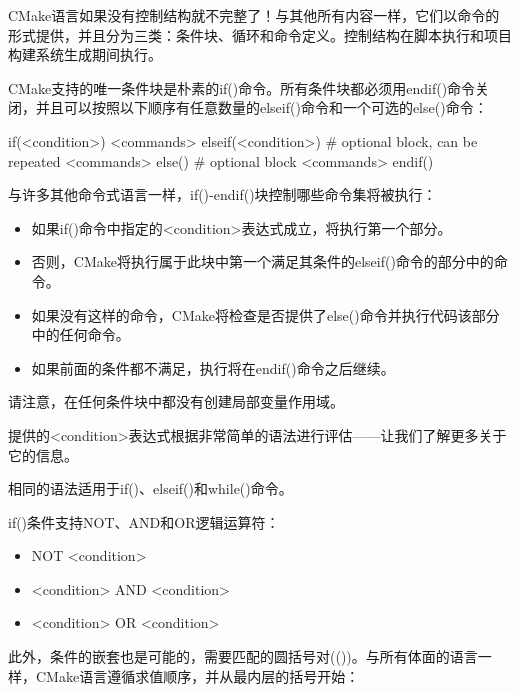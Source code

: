 CMake语言如果没有控制结构就不完整了！与其他所有内容一样，它们以命令的形式提供，并且分为三类：条件块、循环和命令定义。控制结构在脚本执行和项目构建系统生成期间执行。


CMake支持的唯一条件块是朴素的if()命令。所有条件块都必须用endif()命令关闭，并且可以按照以下顺序有任意数量的elseif()命令和一个可选的else()命令：

\begin{shell}
if(<condition>)
    <commands>
elseif(<condition>) # optional block, can be repeated
    <commands>
else() # optional block
    <commands>
endif()
\end{shell}

与许多其他命令式语言一样，if()-endif()块控制哪些命令集将被执行：

\begin{itemize}
\item
如果if()命令中指定的<condition>表达式成立，将执行第一个部分。

\item
否则，CMake将执行属于此块中第一个满足其条件的elseif()命令的部分中的命令。

\item
如果没有这样的命令，CMake将检查是否提供了else()命令并执行代码该部分中的任何命令。

\item
如果前面的条件都不满足，执行将在endif()命令之后继续。
\end{itemize}

请注意，在任何条件块中都没有创建局部变量作用域。

提供的<condition>表达式根据非常简单的语法进行评估——让我们了解更多关于它的信息。


相同的语法适用于if()、elseif()和while()命令。


if()条件支持NOT、AND和OR逻辑运算符：

\begin{itemize}
\item
NOT <condition>

\item
<condition> AND <condition>

\item
<condition> OR <condition>
\end{itemize}

此外，条件的嵌套也是可能的，需要匹配的圆括号对(())。与所有体面的语言一样，CMake语言遵循求值顺序，并从最内层的括号开始：

